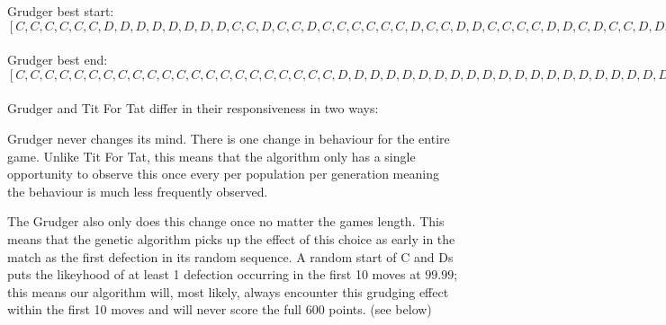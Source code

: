 Grudger best start:\([C, C, C, C, C, C, D, D, D, D, D, D, D, D, C, C, D, C, C, D, C, C, C, C, C, C, D, C, C, D, D, C, C, C, C, D, D, C, D, C, C, D, D, D, D, D, D, D, D, D, D, C, D, C, D, D, D, C, D, D, D, C, D, C, D, C, C, D, D, C, D, C, D, D, C, C, C, D, D, D, D, D, C, C, D, D, C, C, D, C, D, D, C, D, C, C, C, C, D, C, C, D, C, D, C, C, D, D, D, C, D, C, C, D, D, C, D, D, D, D, D, D, D, C, C, C, D, D, C, D, D, C, C, C, D, C, D, D, D, D, D, C, D, C, D, C, D, C, D, C, D, C, C, C, C, D, C, D, C, D, D, D, D, C, C, D, C, D, D, D, C, D, C, C, D, D, D, C, C, C, C, D, C, D, D, D, C, C, D, D, D, D, C, C, D, C, C, D, D, D]\)\label{seq:grudger-start}\\ 

Grudger best end:\([C, C, C, C, C, C, C, C, C, C, C, C, C, C, C, C, C, C, C, C, C, C, D, D, D, D, D, D, D, D, D, D, D, D, D, D, D, D, D, D, D, D, D, D, D, D, D, D, D, D, D, D, D, D, D, D, D, D, D, D, D, D, D, D, D, D, D, D, D, D, D, D, D, D, D, D, D, D, D, D, D, D, D, D, D, D, D, D, D, D, D, D, D, D, D, D, D, D, D, D, D, D, D, D, D, D, D, D, D, D, D, D, D, D, D, D, D, D, D, D, D, D, D, D, D, D, D, D, D, D, D, D, D, D, D, D, D, D, D, D, D, D, D, D, D, D, D, D, D, D, D, D, D, D, D, D, D, D, D, D, D, D, D, D, D, D, D, D, D, D, D, D, D, D, D, D, D, D, D, D, D, D, D, D, D, D, D, D, D, D, D, D, D, D, D, D, D, D, D, D]\)\label{seq:grudger-end}\\            

Grudger and Tit For Tat differ in their responsiveness in two ways: 
            
\begin{itemize}
    \begin{item}
        Grudger never changes its mind. There is one change in behaviour for the entire game. Unlike Tit For Tat, this means that the algorithm only has a single opportunity to observe this once every per population per generation meaning the behaviour is much less frequently observed.
    \end{item}
    \begin{item}
        The Grudger also only does this change once no matter the games length. This means that the genetic algorithm picks up the effect of this choice as early in the match as the first defection in its random sequence. A random start of C and Ds puts the likeyhood of at least 1 defection occurring in the first 10 moves at \(99.99\); this means our algorithm will, most likely, always encounter this grudging effect within the first 10 moves and will never score the full 600 points. (see below)
    \end{item}
\end{itemize}
            
